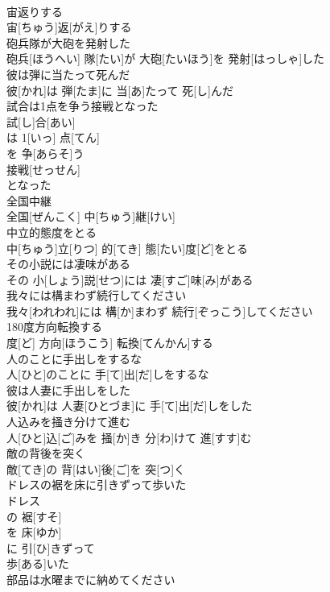 \documentclass[8pt]{extreport}
\begin{document}
\begin{CJK}{UTF8}{min}
\\	宙返りする	
\\	宙[ちゅう]返[がえ]りする
\\	砲兵隊が大砲を発射した	
\\	砲兵[ほうへい] 隊[たい]が 大砲[たいほう]を 発射[はっしゃ]した
\\	彼は弾に当たって死んだ	
\\	彼[かれ]は 弾[たま]に 当[あ]たって 死[し]んだ
\\	試合は1点を争う接戦となった	
\\	試[し]合[あい]
\\	は 1[いっ] 点[てん]
\\	を 争[あらそ]う 
\\	接戦[せっせん]
\\	となった
\\	全国中継	
\\	全国[ぜんこく] 中[ちゅう]継[けい]
\\	中立的態度をとる	
\\	中[ちゅう]立[りつ] 的[てき] 態[たい]度[ど]をとる
\\	その小説には凄味がある	
\\	その 小[しょう]説[せつ]には 凄[すご]味[み]がある
\\	我々には構まわず続行してください	
\\	我々[われわれ]には 構[か]まわず 続行[ぞっこう]してください
\\	180度方向転換する	
\\	度[ど] 方向[ほうこう] 転換[てんかん]する
\\	人のことに手出しをするな	
\\	人[ひと]のことに 手[て]出[だ]しをするな
\\	彼は人妻に手出しをした	
\\	彼[かれ]は 人妻[ひとづま]に 手[て]出[だ]しをした
\\	人込みを掻き分けて進む	
\\	人[ひと]込[ご]みを 掻[か]き 分[わ]けて 進[すす]む
\\	敵の背後を突く	
\\	敵[てき]の 背[はい]後[ご]を 突[つ]く
\\	ドレスの裾を床に引きずって歩いた	
\\	ドレス 
\\	の 裾[すそ]
\\	を 床[ゆか]
\\	に 引[ひ]きずって 
\\	歩[ある]いた 
\\	部品は水曜までに納めてください	

\end{CJK}
\end{document}
